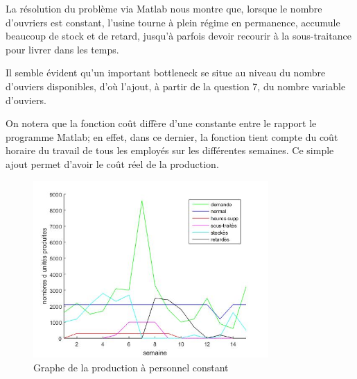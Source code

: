 La résolution du problème via Matlab nous montre que, lorsque le nombre d'ouvriers est constant, l'usine tourne à plein régime en permanence, accumule beaucoup de stock et de retard, jusqu'à parfois devoir recourir à la sous-traitance pour livrer dans les temps.

Il semble évident qu'un important bottleneck se situe au niveau du nombre d'ouviers disponibles, d'où l'ajout, à partir de la question 7, du nombre variable d'ouviers.

On notera que la fonction coût diffère d'une constante entre le rapport le programme Matlab; en effet, dans ce dernier, la fonction tient compte du coût horaire du travail de tous les employés sur les différentes semaines. Ce simple ajout permet d'avoir le coût réel de la production.

\begin{figure}[h]
    \centering
    \includegraphics[width=0.8\textwidth]{graphes/graphq3.jpg}
    \caption{Graphe de la production à personnel constant}
    \label{fig:q3}
\end{figure}
